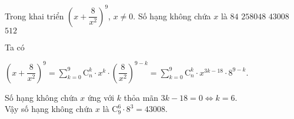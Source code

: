 \begin{ex}%
	Trong khai triển $\left(x+\dfrac{8}{x^2}\right)^9$, $x\ne 0$. Số hạng không chứa $x$ là
	\choice
	{$84$}
	{$258048$}
	{\True $43008$}
	{$512$}
	\loigiai
	{
		Ta có 
		\begin{center}
			$\left(x+\dfrac{8}{x^2}\right)^9=\displaystyle\sum\limits_{k = 0}^{9}\mathrm{C}_n^k\cdot x^k\cdot \left(\dfrac{8}{x^2}\right)^{9-k}=\displaystyle\sum\limits_{k = 0}^{9}\mathrm{C}_n^k\cdot x^{3k-18}\cdot 8^{9-k}.$
		\end{center}
		Số hạng không chứa $x$ ứng với $k$ thỏa mãn $3k-18=0\Leftrightarrow k=6$.\\
		Vậy số hạng không chứa $x$ là $\mathrm{C}_9^6\cdot 8^3=43008.$
	}
\end{ex} 

